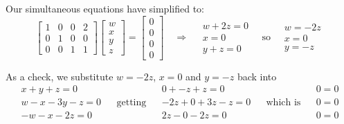 \documentclass[a4paper]{report}
\begin{document}
Our simultaneous equations have simplified to:
\begin{equation*}
\begin{bmatrix}
1  &  0 & 0  & 2 \\
0  &  1 & 0  & 0 \\
0  &  0 & 1  & 1
\end{bmatrix}
\begin{bmatrix}
w \\ x \\ y \\ z
\end{bmatrix}
=
\begin{bmatrix}
0 \\ 0 \\ 0 \\ 0
\end{bmatrix}
\quad
\Rightarrow
\quad
\begin{matrix}
w + 2z  = 0 \\
x = 0 \\
y + z = 0
\end{matrix}
\quad \text{so} \quad
\begin{matrix}
w = -2z \\ x = 0 \\ y = -z
\end{matrix}
\end{equation*}

As a check, we substitute $w = -2z $, $x=0$ and $ y = -z $ back into
\begin{align*}
x + y + z = 0      & &                  & & 0 + -z +z = 0        & &                 & & 0 = 0 \\
w - x - 3y - z = 0 & & \mathrm{getting} & & -2z + 0 + 3z - z = 0 & & \text{which is} & & 0 = 0 \\
-w - x - 2z = 0    & &                  & & 2z - 0 - 2z = 0      & &                 & & 0 = 0
\end{align*}

\end{document}
